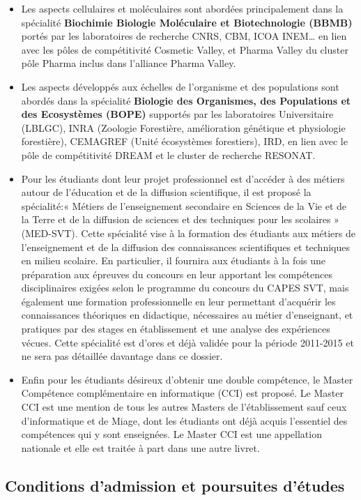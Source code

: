 \documentclass[10pt, a5paper]{report}
\begin{document}
\begin{spacing}{1.5}
\begin{itemize}
\item Les aspects cellulaires et moléculaires sont abordées principalement dans la spécialité \textbf{Biochimie Biologie Moléculaire et Biotechnologie (BBMB)} portés par les laboratoires de recherche  CNRS, CBM, ICOA INEM… en lien avec les pôles de compétitivité Cosmetic Valley, et Pharma Valley du cluster pôle Pharma inclus dans l’alliance Pharma Valley. 
\item Les aspects développés aux échelles de l’organisme et des populations sont abordés dans la spécialité \textbf{Biologie des Organismes, des Populations et des Ecosystèmes (BOPE)} supportés par les laboratoires Universitaire (LBLGC), INRA (Zoologie Forestière, amélioration génétique et physiologie forestière), CEMAGREF (Unité écosystèmes forestiers), IRD, en lien avec le pôle de compétitivité DREAM et le cluster de recherche RESONAT.
\item Pour les étudiants dont leur projet professionnel est d’accéder à des métiers autour de l’éducation et de la diffusion scientifique, il est proposé la spécialité:« Métiers de l’enseignement secondaire en Sciences de la Vie et de la Terre et de la diffusion de sciences et des techniques pour les scolaires » (MED-SVT). Cette spécialité vise à la formation des étudiants aux métiers de l’enseignement et de la diffusion des connaissances scientifiques et techniques en milieu scolaire. En particulier, il fournira aux étudiants à la fois une préparation aux épreuves du concours en leur apportant les compétences disciplinaires exigées selon le programme du concours du CAPES SVT, mais également une formation professionnelle en leur permettant d’acquérir les connaissances théoriques en didactique, nécessaires au métier d’enseignant, et pratiques par des stages en établissement et une analyse des expériences vécues.  
Cette spécialité est d’ores et déjà validée pour la période 2011-2015 et ne sera pas détaillée davantage dans ce dossier.
\item Enfin pour les étudiants désireux d’obtenir une double compétence, le Master Compétence complémentaire en informatique (CCI) est proposé. Le Master CCI est une mention de tous les autres Masters de l'établissement sauf ceux d'informatique et de Miage, dont les étudiants ont déjà acquis l'essentiel des compétences qui y sont enseignées. Le Master CCI est une appellation nationale et elle est traitée à part dans une autre livret.
\end{itemize}

\subsection*{Conditions d'admission et poursuites d'études}


\end{spacing}
\end{document}
